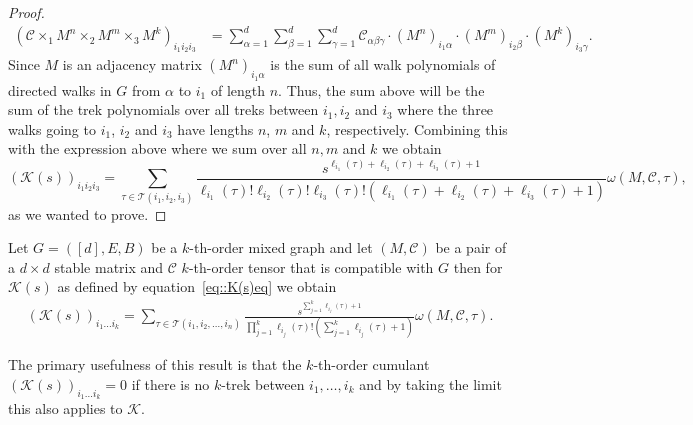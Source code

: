 \documentclass{biometrika}
\begin{document}
\begin{proof}
\begin{align*}
    (\mathcal{C} \times_1  M^n \times_2 M^m \times_3  M^k)_{i_1 i_2 i_3 } &= \sum_{\alpha = 1}^{d} 
    \sum_{\beta = 1}^{d} \sum_{\gamma = 1}^{d} 
    \mathcal{C}_{\alpha \beta \gamma} \cdot (M^{n})_{i_1 \alpha} \cdot (M^{m})_{i_2 \beta} \cdot (M^{k})_{i_3 \gamma}. 
\end{align*} 
Since $M$ is an adjacency matrix $(M^{n})_{i_1 \alpha}$ is the sum of all walk polynomials of directed walks in $G$ from $\alpha$ 
to $i_1$ of length $n$. Thus, the sum above will be the sum of the trek polynomials over all treks between $i_1, i_2$ and $i_3$ where the three walks going to 
$i_1$, $i_2$ and $i_3$ have lengths $n$, $m$ and $k$, respectively. Combining this with the expression above where we sum over all 
$n,m$ and $k$ we obtain 
\begin{equation*}
    (\mathcal{K} (s))_{i_1 i_2 i_3} =  \sum_{\tau \in \mathcal{T}(i_1, i_2, i_3)} 
    \frac{s^{\ell_{i_1}(\tau)+\ell_{i_2}(\tau)+\ell_{i_3}(\tau)+1}}{\ell_{i_1}(\tau)! \ell_{i_2}(\tau)! \ell_{i_3}(\tau)! (\ell_{i_1}(\tau)+\ell_{i_2}(\tau)+\ell_{i_3}(\tau)+1)}   
    \omega(M,\mathcal{C},\tau), 
\end{equation*}
as we wanted to prove. 
\end{proof}


\begin{proposition} 
    Let $G = ([d],E,B)$ be a $k$-th-order mixed graph and let $(M,\mathcal{C})$ be a pair of a $d\times d$ stable matrix and $\mathcal{C}$ $k$-th-order tensor that is compatible with $G$ then for $\mathcal{K}(s)$ as defined by equation~\eqref{eq::K(s)eq} we obtain 
\begin{align*}
(\mathcal{K} (s))_{i_1 \dots i_k} =  \sum_{\tau \in \mathcal{T}(i_1, i_2, \dots ,i_n)} 
\frac{s^{ \sum_{j = 1}^k \ell_{i_j}(\tau) +1}}{ \prod_{j = 1}^{k} \ell_{i_j}(\tau)! \left(\sum_{j = 1}^k \ell_{i_j}(\tau)+1 \right)}   
\omega(M,\mathcal{C},\tau).  
\end{align*}
\end{proposition}

\begin{remark}
    The primary usefulness of this result is that the $k$-th-order cumulant $(\mathcal{K} (s))_{i_1 \dots i_k} = 0$ if there is no $k$-trek between $i_1, \dots, i_k$ and by taking the limit this also applies to $\mathcal{K} $. 
\end{remark}
\end{document}
